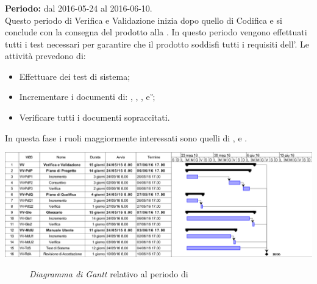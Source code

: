 \subsubsection{\VV}
\textbf{Periodo:} dal 2016-05-24 al 2016-06-10. \\
Questo periodo di Verifica e Validazione inizia dopo quello di Codifica e si conclude con la consegna del prodotto alla \RA. In questo periodo vengono effettuati tutti i test necessari per garantire che il prodotto soddisfi tutti i requisiti dell'\AR.
Le attività prevedono di:
\begin{itemize}
	\item Effettuare dei test di sistema;
	\item Incrementare i documenti di: \textit{\MU}, \textit{\NdP}, \textit{\PdP}, \textit{\PdQ} e \textit{\G};
	\item Verificare tutti i documenti sopraccitati.
\end{itemize}
In questa fase i ruoli maggiormente interessati sono quelli di \textit{\Res}, \textit{\Prog} e \textit{\Ver}.
\newpage
\begin{center}
	\includegraphics[keepaspectratio = true, width=16cm]{immagini/PdP_VerificaEValidazioneGantt.png}
\end{center}
\begin{figure}[h]
	\caption{\textit{Diagramma di Gantt} relativo al periodo di \VV}\label{etichetta}
\end{figure}
